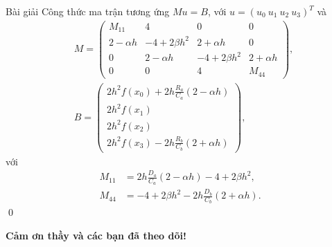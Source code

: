 \documentclass[9pt]{beamer}
\begin{document}
\begin{frame}
    \begin{exampleblock}{Bài giải}
    Công thức ma trận tương ứng $Mu = B$, với $u = (u_0 \  u_1 \  u_2 \   u_3)^T$ và
    \begin{align*}
        & M = \begin{pmatrix}
        M_{11} & 4 & 0 & 0 \\
        2 - \alpha h & -4 + 2\beta h^2 & 2 + \alpha h & 0 \\
        0 & 2 - \alpha h & -4 + 2\beta h^2 & 2 + \alpha h \\
        0 & 0 & 4 & M_{44}
        \end{pmatrix}, \\
        & B = \begin{pmatrix}
        2h^2 f(x_0) + 2h\frac{R_a}{C_a}(2 - \alpha h) \\
        2h^2 f(x_1) \\
        2h^2 f(x_2) \\
        2h^2 f(x_3) - 2h \frac{R_b}{C_b}(2 + \alpha h)
        \end{pmatrix},
    \end{align*}
    với
    \begin{align*}
        M_{11} &= 2h\frac{D_a}{C_a}(2 - \alpha h) - 4 + 2\beta h^2, \\
        M_{44} &= -4 + 2\beta h^2 - 2h\frac{D_b}{C_b}(2 + \alpha h).
    \end{align*} \hfill \qed
    \end{exampleblock}
\end{frame}

\begin{frame}
    \begin{center}
        \Huge {\bf Cảm ơn thầy và các bạn đã theo dõi!}
    \end{center}
\end{frame}
\end{document}
